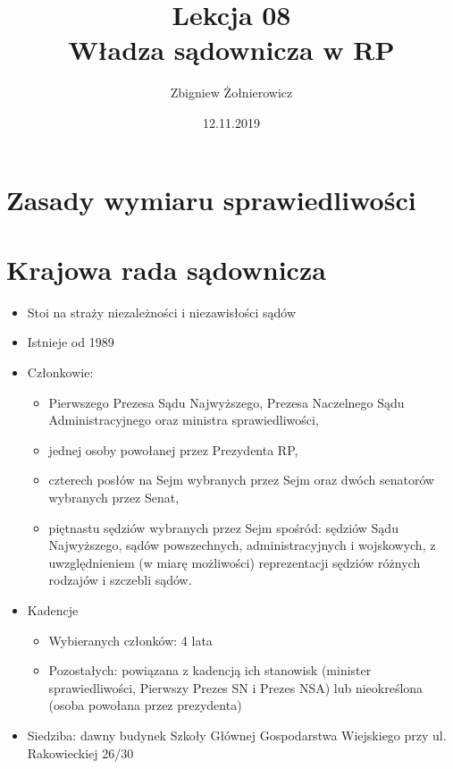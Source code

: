 \documentclass[a4paper]{article}
\begin{document}
\title{{\huge Lekcja 08} \\
{\large Władza sądownicza w RP}}
\author{Zbigniew Żołnierowicz}
\date{12.11.2019}
\maketitle
\section{Zasady wymiaru sprawiedliwości}
\section{Krajowa rada sądownicza}
\begin{itemize}
    \item Stoi na straży niezależności i niezawisłości sądów
    \item Istnieje od 1989
    \item Członkowie: \begin{itemize}
        \item Pierwszego Prezesa Sądu Najwyższego, Prezesa Naczelnego Sądu Administracyjnego oraz ministra sprawiedliwości,
        \item jednej osoby powołanej przez Prezydenta RP,
        \item czterech posłów na Sejm wybranych przez Sejm oraz dwóch senatorów wybranych przez Senat,
        \item piętnastu sędziów wybranych przez Sejm spośród: sędziów Sądu Najwyższego, sądów powszechnych, administracyjnych i wojskowych, z uwzględnieniem (w miarę możliwości) reprezentacji sędziów różnych rodzajów i szczebli sądów.
    \end{itemize}
    \item Kadencje \begin{itemize}
        \item Wybieranych członków: 4 lata
        \item Pozostałych: powiązana z kadencją ich stanowisk (minister spra\-wiedliwości, Pierwszy Prezes SN i Prezes NSA) lub nieokreślona (osoba powołana przez prezydenta)
    \end{itemize}
    \item Siedziba: dawny budynek Szkoły Głównej Gospodarstwa Wiejskiego przy ul. Rakowieckiej 26/30
\end{itemize}
\end{document}
